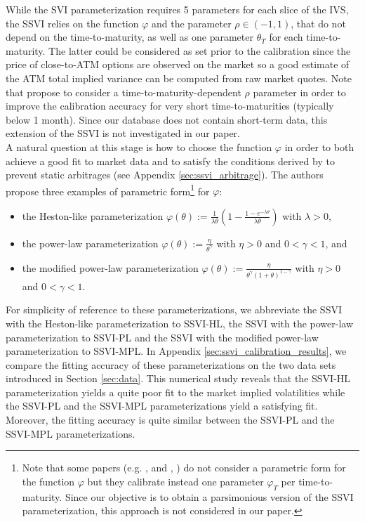 While the SVI parameterization requires 5 parameters for each slice of the IVS, the SSVI relies on the function $\varphi$ and the parameter $\rho\in(-1,1)$, that do not depend on the time-to-maturity, as well as one parameter $\theta_T$ for each time-to-maturity. The latter could be considered as set prior to the calibration since the price of close-to-ATM options are observed on the market so a good estimate of the ATM total implied variance can be computed from raw market quotes. Note that \cite{hendriks2017extended} propose to consider a time-to-maturity-dependent $\rho$ parameter in order to improve the calibration accuracy for very short time-to-maturities (typically below 1 month). Since our database does not contain short-term data, this extension of the SSVI is not investigated in our paper.\\

A natural question at this stage is how to choose the function $\varphi$ in order to both achieve a good fit to market data and to satisfy the conditions derived by \cite{gatheral2014arbitrage} to prevent static arbitrages (see Appendix \ref{sec:ssvi_arbitrage}). The authors propose three examples of parametric form\footnote{Note that some papers (e.g. \citeauthor{corbetta2019robust}, \citeyear{corbetta2019robust} and \citeauthor{mingone2022no}, \citeyear{mingone2022no}) do not consider a parametric form for the function $\varphi$ but they calibrate instead one parameter $\varphi_T$ per time-to-maturity. Since our objective is to obtain a parsimonious version of the SSVI parameterization, this approach is not considered in our paper.} for $\varphi$:
\begin{itemize}
    \item the Heston-like parameterization $\varphi(\theta):=\frac{1}{\lambda \theta}\left(1-\frac{1-e^{-\lambda \theta}}{\lambda\theta} \right)$ with $\lambda >0$,
    \item the power-law parameterization $\varphi(\theta):= \frac{\eta}{\theta^{\gamma}}$ with $\eta>0$ and $0< \gamma < 1$, and 
    \item  the modified power-law parameterization $\varphi(\theta):= \frac{\eta}{\theta^{\gamma}(1+\theta)^{1-\gamma}}$
    with $\eta>0$ and $0<\gamma < 1$.
\end{itemize}

For simplicity of reference to these parameterizations, we abbreviate the SSVI with the Heston-like parameterization to SSVI-HL, the SSVI with the power-law parameterization to SSVI-PL and the SSVI with the modified power-law parameterization to SSVI-MPL. In Appendix \ref{sec:ssvi_calibration_results}, we compare the fitting accuracy of these parameterizations on the two data sets introduced in Section \ref{sec:data}. This numerical study reveals that the SSVI-HL parameterization yields a quite poor fit to the market implied volatilities while the SSVI-PL and the SSVI-MPL parameterizations yield a satisfying fit. Moreover, the fitting accuracy is quite similar between the SSVI-PL and the SSVI-MPL parameterizations.\\

